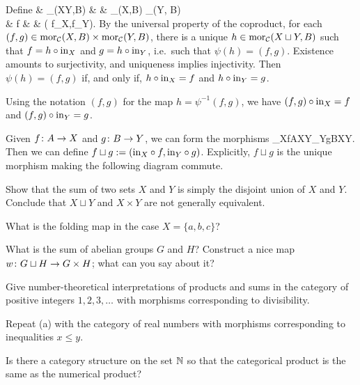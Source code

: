 \item Define
\psi\cl & \mor_{}(X\sqcup Y,B) & \to & \mor_{}(X,B) \times \mor_{}(Y, B) \\
& f & \mapsto & ( f\circ \inj_X,f\circ \inj_Y).
\ei
By the universal property of the coproduct, for each $(f,g)\in \operatorname{mor}_{\mathcal{C}}(X,B) \times \operatorname{mor}_{\mathcal{C}}(Y, B)$, there is a unique $h\in\operatorname{mor}_{\mathcal{C}}(X\sqcup Y,B)$ such that $f= h\circ \mathrm{in}_X$ and $g=h\circ \mathrm{in}_Y$, i.e.\ such that $\psi(h)=(f,g)$. Existence amounts to surjectivity, and uniqueness implies injectivity. Then $\psi(h)=(f,g)$ if, and only if, $h\circ\mathrm{in}_X=f$ and $h\circ\mathrm{in}_Y=g$. 

Using the notation $(f,g)$ for the map $h=\psi^{-1}(f,g)$, we have $(f,g)\circ\mathrm{in}_X=f$ and $(f,g)\circ\mathrm{in}_Y=g$.
\item Given $f\colon A\to X$ and $g\colon B\to Y$, we can form the morphisms
\bse
\inj_X\circ f\cl A\to X\sqcup Y\qquad {}\qquad \inj_Y\circ g\cl B\to X\sqcup Y.
\ese
Then we can define $f\sqcup g:=(\mathrm{in}_X\circ f,\mathrm{in}_Y\circ g)$. Explicitly, $f\sqcup g$ is the unique morphism making the following diagram commute.
\bse
{}
\ese
\item
\item
\een
\es


\bx
\ben[label=(\alph*)]
\item Show that the sum of two sets $X$ and $Y$ is simply the disjoint union of $X$ and $Y$. Conclude that $X\sqcup Y$ and $X\times Y$ are not generally equivalent.
\item What is the folding map in the case $X = \{a, b, c\}$?
\item What is the sum of abelian groups $G$ and $H$? Construct a nice map $w \colon G \sqcup H \to G \times H$; what can you say about it?
\een
\ex

\bs
\ben[label=(\alph*)]
\item
\item
\item
\een
\es

\bx
\ben[label=(\alph*)]
\item Give number-theoretical interpretations of products and sums in the category of positive integers $1,2,3,\ldots$ with morphisms corresponding to divisibility.
\item Repeat (a) with the category of real numbers with morphisms corresponding to inequalities $x \leq y$.
\item Is there a category structure on the set $\mathbb{N}$ so that the categorical product is the same as the numerical product?
\een
\ex

